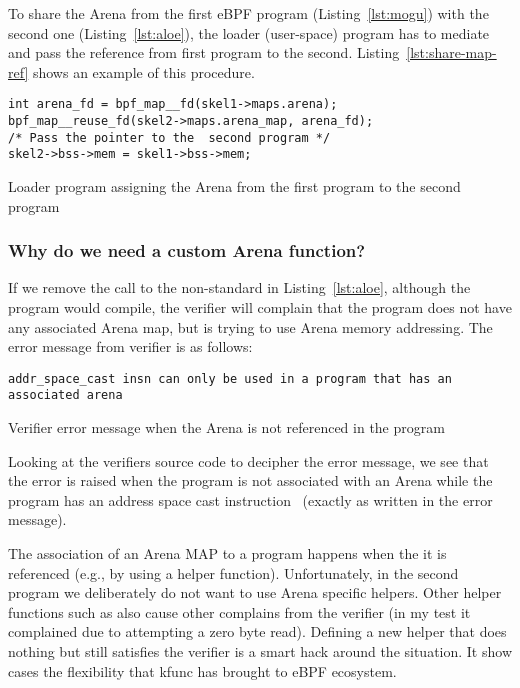 \documentclass{article}
\begin{document}
To share the Arena from the first eBPF program (Listing~\ref{lst:mogu})
with the second one (Listing~\ref{lst:aloe}), the loader (user-space) program
has to mediate and pass the reference from first program to the second.
Listing~\ref{lst:share-map-ref} shows an example of this procedure.

\begin{listing}
\begin{verbatim}
int arena_fd = bpf_map__fd(skel1->maps.arena);
bpf_map__reuse_fd(skel2->maps.arena_map, arena_fd);
/* Pass the pointer to the  second program */
skel2->bss->mem = skel1->bss->mem;
\end{verbatim}
\caption{Loader program assigning the Arena from the first program to the second program}
\label{lst:share-map-ref}
\end{listing}

\subsubsection{Why do we need a custom Arena function?}
\label{sec:need_custom}
If we remove the call to the non-standard  in
Listing~\ref{lst:aloe}, although the program would compile, the verifier will
complain that the program does not have any associated Arena map, but is trying
to use Arena memory addressing. The error message from verifier is as follows:

\begin{listing}
\begin{verbatim}
addr_space_cast insn can only be used in a program that has an associated arena
\end{verbatim}
\caption{Verifier error message when the Arena is not referenced in the program}
\label{lst:verifier_err_msg}
\end{listing}

Looking at the verifiers source code to decipher the error message, we see that
the error is raised when the program is not associated with an Arena while the
program has an address space cast instruction~\cite{verifier_arena_not_set}
(exactly as written in the error message).

The association of an Arena MAP to a program happens when the it is referenced
(e.g., by using a helper function). Unfortunately, in the second program we
deliberately do not want to use Arena specific helpers. Other helper functions
such as  also cause other complains from the verifier
(in my test it complained due to attempting a zero byte read). Defining a new
helper that does nothing but still satisfies the verifier is a smart hack
around the situation. It show cases the flexibility that kfunc has brought to
eBPF ecosystem.
\end{document}
